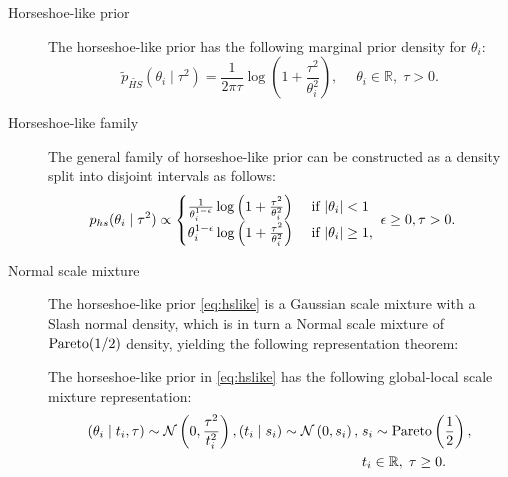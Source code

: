 \documentclass[11pt]{article}
\begin{document}
\begin{description}
\item [Horseshoe-like prior] The horseshoe-like prior
  \citet{bhadra2017horseshoe} has the following marginal prior density for
    $\theta_i$: 
\begin{equation}
\tilde p_{\tilde{HS}} (\theta_i \mid \tau^2) = \frac{1}{2 \pi{\tau}}\log \left ( 1 + \frac{\tau^2}{\theta_i^2} \right ), \quad  \; \theta_i  \in \mathbb{R},\; \tau > 0. \label{eq:hslike}
\end{equation}
\item [Horseshoe-like family] The general family of horseshoe-like prior can be constructed as a density split into disjoint intervals as follows:
\begin{align}
p_{hs}(\theta_i \mid \tau^2)&  \propto \begin{cases} 
      \frac{1}{\theta_i^{1-\epsilon}}\log \left( 1 + \frac{\tau^2}{\theta_i^2} \right) & \text{ if } {\lvert\theta_i\rvert < 1} \\
      \theta_i^{1-\epsilon} \log \left( 1 + \frac{\tau^2}{\theta_i^2} \right) & \text{ if }{\lvert\theta_i\rvert \ge 1}, \\
      \end{cases} 
\; \epsilon \ge 0,\tau > 0. \label{eq:split} 
\end{align}
\item [Normal scale mixture] The horseshoe-like prior \eqref{eq:hslike} is a Gaussian scale mixture with a Slash normal density, which is in turn a Normal scale mixture of ${\rm Pareto}(1/2)$ density, yielding the following representation theorem: 
\begin{theorem}\label{th:hslike}
The horseshoe-like prior in \eqref{eq:hslike} has the following global-local scale mixture representation:
\begin{align}
(\theta_i \mid t_i, \tau) \sim {\cal N}\left(0, \frac{\tau^2}{t_i^2} \right), (t_i \mid s_i)  \sim {\cal N}\left(0, s_i \right), \; & s_i \sim \mathrm{Pareto}\left( \frac{1}{2} \right), \label{eq:pareto}\\ 
& t_i \in \mathbb{R}, \; \tau \ge 0. \nonumber
\end{align}
\end{theorem}
\end{description}
\end{document}
